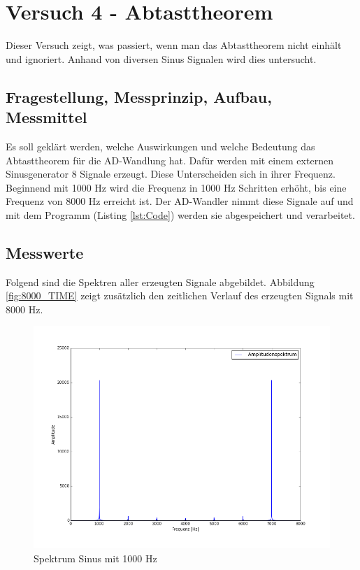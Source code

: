 \documentclass[12pt,oneside,a4paper]{report}
\begin{document}
%
%
\chapter{Versuch 4 - Abtasttheorem}
\label{chap:VERSUCH_4}

Dieser Versuch zeigt, was passiert, wenn man das Abtasttheorem nicht einhält und ignoriert.
Anhand von diversen Sinus Signalen wird dies untersucht.

\section{Fragestellung, Messprinzip, Aufbau, Messmittel}
\label{chap:VERSUCH_4_FRAGESTELLUNG}

Es soll geklärt werden, welche Auswirkungen und welche Bedeutung das Abtasttheorem für die AD-Wandlung hat.
Dafür werden mit einem externen Sinusgenerator 8 Signale erzeugt.
Diese Unterscheiden sich in ihrer Frequenz. Beginnend mit 1000 Hz wird die Frequenz in 1000 Hz Schritten erhöht, bis eine Frequenz von 8000 Hz erreicht ist.
Der AD-Wandler nimmt diese Signale auf und mit dem Programm (Listing \ref{lst:Code}) werden sie abgespeichert und verarbeitet.

\section{Messwerte}
\label{chap:VERSUCH_4_MESSWERTE}

Folgend sind die Spektren aller erzeugten Signale abgebildet.
Abbildung \ref{fig:8000_TIME} zeigt zusätzlich den zeitlichen Verlauf des erzeugten Signals mit 8000 Hz.

\begin{figure}[H]
\centering\small
\includegraphics[scale=0.4]{src/1000fft.png}
\caption{Spektrum Sinus mit 1000 Hz}
\label{fig:1000_FFT}
\end{figure}
\end{document}
